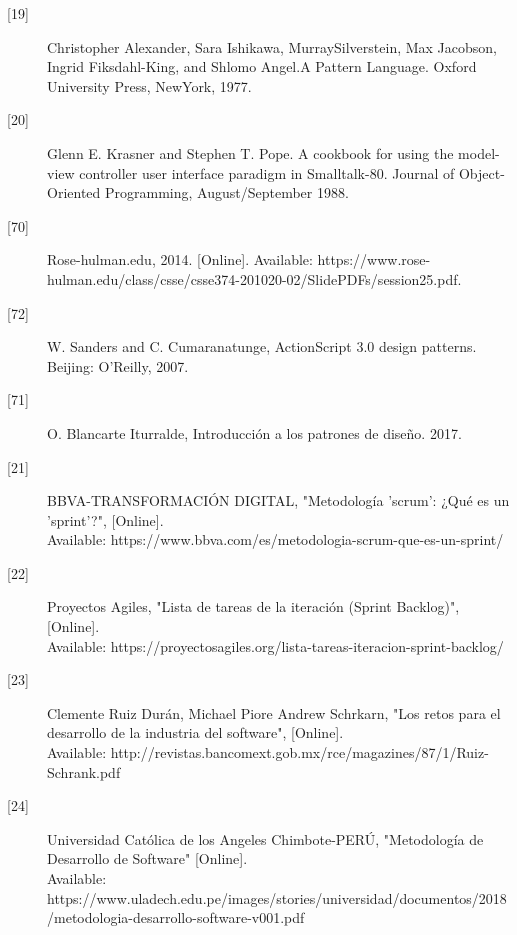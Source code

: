 \begin{description}
		\item[\hypertarget{b19}{[19]}] Christopher Alexander, Sara Ishikawa, MurraySilverstein, Max Jacobson,
		Ingrid Fiksdahl-King, and Shlomo Angel.A Pattern Language. Oxford University
		Press, NewYork, 1977.
		
		\item[\hypertarget{b20}{[20]}] Glenn E. Krasner and Stephen T. Pope. A cookbook for using the model-view
		controller user interface paradigm in Smalltalk-80. Journal of Object-Oriented Programming, August/September 1988.
		
		\item[\hypertarget{b70}{[70]}] Rose-hulman.edu, 2014. [Online]. Available: https://www.rose-hulman.edu/class/csse/csse374-201020-02/SlidePDFs/session25.pdf. 
		
		\item[\hypertarget{b72}{[72]}] W. Sanders and C. Cumaranatunge, ActionScript 3.0 design patterns. Beijing: O'Reilly, 2007.
		
		\item[\hypertarget{b71}{[71]}] O. Blancarte Iturralde, Introducción a los patrones de diseño. 2017.
		
		\item[\hypertarget{b21}{[21]}] BBVA-TRANSFORMACIÓN DIGITAL, "Metodología 'scrum': ¿Qué es un 'sprint'?", [Online].\\ Available: https://www.bbva.com/es/metodologia-scrum-que-es-un-sprint/
		
		\item[\hypertarget{b22}{[22]}] Proyectos Agiles, "Lista de tareas de la iteración (Sprint Backlog)", [Online].\\ Available: https://proyectosagiles.org/lista-tareas-iteracion-sprint-backlog/
		
		\item[\hypertarget{b23}{[23]}] Clemente Ruiz Durán, Michael Piore
		Andrew Schrkarn, "Los retos para el desarrollo
		de la industria del software", [Online].\\ Available: http://revistas.bancomext.gob.mx/rce/magazines/87/1/Ruiz-Schrank.pdf

		\item[\hypertarget{b24}{[24]}] Universidad Católica de los Angeles Chimbote-PERÚ, "Metodología de Desarrollo de Software"  [Online].\\ Available: https://www.uladech.edu.pe/images/stories/universidad/documentos/2018/metodologia-desarrollo-software-v001.pdf
		

\end{description}
